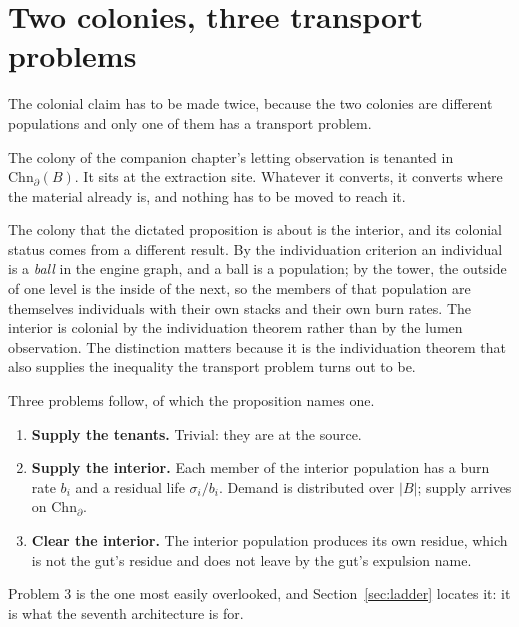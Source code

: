 \documentclass[11pt]{article}
\theoremstyle{plain}
\theoremstyle{definition}
\newcommand{\Chn}{\mathrm{Chn}}
\begin{document}
\section{Two colonies, three transport problems}
\label{sec:two}

The colonial claim has to be made twice, because the two colonies are different populations and only
one of them has a transport problem.

The colony of the companion chapter's letting observation is tenanted in $\Chn_{\partial}(B)$. It
sits at the extraction site. Whatever it converts, it converts where the material already is, and
nothing has to be moved to reach it.

The colony that the dictated proposition is about is the interior, and its colonial status comes from
a different result. By the individuation criterion an individual is a \emph{ball} in the engine
graph, and a ball is a population; by the tower, the outside of one level is the inside of the next,
so the members of that population are themselves individuals with their own stacks and their own burn
rates. The interior is colonial by the individuation theorem rather than by the lumen observation.
The distinction matters because it is the individuation theorem that also supplies the inequality the
transport problem turns out to be.

Three problems follow, of which the proposition names one.

\begin{enumerate}
\item \textbf{Supply the tenants.} Trivial: they are at the source.
\item \textbf{Supply the interior.} Each member of the interior population has a burn rate $b_i$ and
a residual life $\sigma_i / b_i$. Demand is distributed over $|B|$; supply arrives on
$\Chn_{\partial}$.
\item \textbf{Clear the interior.} The interior population produces its own residue, which is not the
gut's residue and does not leave by the gut's expulsion name.
\end{enumerate}

Problem 3 is the one most easily overlooked, and Section~\ref{sec:ladder} locates it: it is what the
seventh architecture is for.
\end{document}
